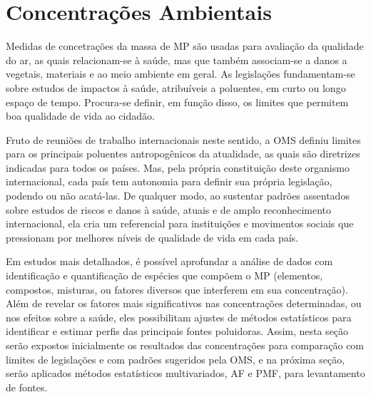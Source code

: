 \newpage
\section{Concentrações Ambientais}

%
%
Medidas de concetrações da massa de MP são usadas para avaliação da qualidade do
ar, as quais relacionam-se à saúde, mas que também associam-se a danos a 
vegetais, materiais e ao meio ambiente em geral. As legislações fundamentam-se 
sobre estudos de impactos à saúde, atribuíveis a poluentes, em curto ou longo 
espaço de tempo. Procura-se definir, em função disso, os limites que permitem 
boa qualidade de vida ao cidadão.

Fruto de reuniões de trabalho internacionais neste sentido, a OMS 
\citeyearpar{who} definiu limites para os principais poluentes antropogênicos 
da atualidade, as quais são diretrizes indicadas para todos os países. Mas, 
pela própria constituição deste organismo internacional, cada país tem autonomia
para definir sua própria legislação, podendo ou não acatá-las. De qualquer modo,
ao sustentar padrões assentados sobre estudos de riscos e danos à saúde, atuais 
e de amplo reconhecimento internacional, ela cria um referencial para 
instituições e movimentos sociais que pressionam por melhores níveis de 
qualidade de vida em cada país.

Em estudos mais detalhados, é possível aprofundar a análise de dados com 
identificação e quantificação de espécies que compõem o MP (elementos, 
compostos, misturas, ou fatores diversos que interferem em sua concentração). 
Além de revelar os fatores mais significativos nas concentrações determinadas, 
ou nos efeitos sobre a saúde, eles possibilitam ajustes de métodos estatísticos 
para identificar e estimar perfis das principais fontes poluidoras. Assim, nesta
seção serão expostos inicialmente os resultados das concentrações para 
comparação com limites de legislações e com padrões sugeridos pela OMS, e na 
próxima seção, serão aplicados métodos 
estatísticos multivariados, AF e PMF, para levantamento de fontes. 

